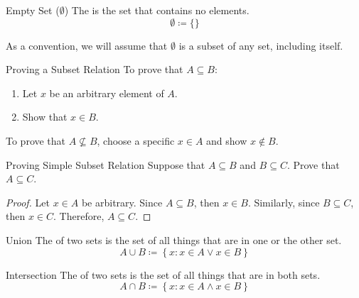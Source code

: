 \begin{dfnbox}{Empty Set ($\emptyset$)}{}
    The  is the set that contains no elements.
    \tcblower
    \[ \emptyset \coloneq \{ \} \]
\end{dfnbox}

As a convention, we will assume that $\emptyset$ is a subset of any set, including itself.


\begin{tecbox}{Proving a Subset Relation}{}
    To prove that $A \subseteq B$:
    \begin{enumerate}
        \item Let $x$ be an arbitrary element of $A$.
        \item Show that $x \in B$.
    \end{enumerate}
    \tcblower
    To prove that $A \not\subseteq B$, choose a specific $x \in A$ and show $x \notin B$.
\end{tecbox}

\begin{exbox}{Proving Simple Subset Relation}{}
    Suppose that $A \subseteq B$ and $B \subseteq C$. Prove that $A \subseteq C$.
    \tcblower
    \begin{proof}
        Let $x \in A$ be arbitrary. Since $A \subseteq B$, then $x \in B$. Similarly, since $B \subseteq C$, then $x \in C$. Therefore, $A \subseteq C$.
    \end{proof}
\end{exbox}

\begin{dfnbox}{Union}{}
    The  of two sets is the set of all things that are in one or the other set.
    \tcblower
    \[ A \cup B \coloneq \left\{ x : x \in A \lor x \in B \right\} \]
\end{dfnbox}

\begin{dfnbox}{Intersection}{}
    The  of two sets is the set of all things that are in both sets.
    \tcblower
    \[ A \cap B \coloneq \left\{ x : x \in A \land x \in B \right\} \]
\end{dfnbox}

